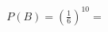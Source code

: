 \documentclass[preview]{standalone}
\begin{document}
\begin{align*}
P(B) = \left(\frac{1}{6}\right)^{10} =
\end{align*}
\end{document}

